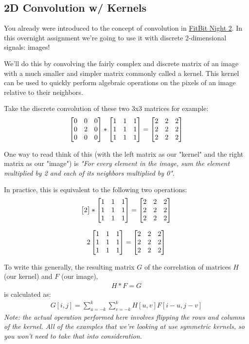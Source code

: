 \documentclass{tufte-handout}
\begin{document}
\subsection{2D Convolution w/ Kernels}

You already were introduced to the concept of convolution in \href{https://drive.google.com/file/d/1_eEtwNDHhF-Izfcf6l00PvG-b6whwety/view}{FitBit Night 2}. In this overnight assignment we're going to use it with discrete 2-dimensional signals: images!

We'll do this by convolving the fairly complex and discrete matrix of an image with a much smaller and simpler matrix commonly called a kernel. This kernel can be used to quickly perform algebraic operations on the pixels of an image relative to their neighbors.

Take the discrete convolution of these two 3x3 matrices for example:
\begin{align}
    \begin{bmatrix} 0 & 0 & 0 \\ 0 & 2 & 0 \\ 0 & 0 & 0 \end{bmatrix} * \begin{bmatrix} 1 & 1 & 1 \\ 1 & 1 & 1 \\ 1 & 1 & 1 \end{bmatrix} =
    \begin{bmatrix} 2 & 2 & 2 \\ 2 & 2 & 2 \\ 2 & 2 & 2 \end{bmatrix}
\end{align}

One way to read think of this (with the left matrix as our "kernel" and the right matrix as our "image") is \emph{"For every element in the image, sum the element multiplied by 2 and each of its neighbors multiplied by 0"}.

In practice, this is equivalent to the following two operations:
\begin{align}\label{eqn:convolution1}
    \begin{bmatrix}2\end{bmatrix} * \begin{bmatrix} 1 & 1 & 1 \\ 1 & 1 & 1 \\ 1 & 1 & 1 \end{bmatrix} =
    \begin{bmatrix} 2 & 2 & 2 \\ 2 & 2 & 2 \\ 2 & 2 & 2 \end{bmatrix}
\end{align}

\begin{align}
    2 \begin{bmatrix} 1 & 1 & 1 \\ 1 & 1 & 1 \\ 1 & 1 & 1 \end{bmatrix} = \begin{bmatrix} 2 & 2 & 2 \\ 2 & 2 & 2 \\ 2 & 2 & 2 \end{bmatrix}
\end{align}

To write this generally, the resulting matrix $G$ of the correlation of matrices $H$ (our kernel) and $F$ (our image),
\begin{align}
    H * F = G
\end{align}
is calculated as:
\begin{align}
    G[i, j] = \sum_{u=-k}^{k} \sum_{v=-k}^{k} H[u, v] F[i - u, j - v]
\end{align}
\emph{Note: the actual operation performed here involves flipping the rows and columns of the kernel. All of the examples that we're looking at use symmetric kernels, so you won't need to take that into consideration.}
\end{document}

